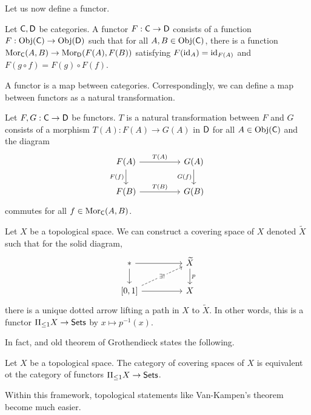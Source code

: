 Let us now define a functor. 
\begin{definition}[Functor]
  Let $\mathsf{C},\mathsf{D}$ be categories. A functor $F:\mathsf{C}\to\mathsf{D}$ consists of a function $F:\mathrm{Obj}(\mathsf{C})\to\mathrm{Obj}(\mathsf{D})$ such that for all $A,B\in\mathrm{Obj}(\mathsf{C})$, there is a function $\mathrm{Mor}_{\mathsf{C}}(A,B)\to\mathrm{Mor}_{\mathsf{D}}(F(A),F(B))$ satisfying $F(\mathrm{id}_{A})=\mathrm{id}_{F(A)}$ and $F(g\circ f)=F(g)\circ F(f)$. 
\end{definition}
A functor is a map between categories. Correspondingly, we can define a map between functors as a natural transformation. 
\begin{definition}\label{def:natural transformation}
Let $F,G:\mathsf{C}\to\mathsf{D}$ be functors. $T$ is a natural transformation between $F$ and $G$ consists of a morphism $T(A):F(A)\to G(A)$ in $\mathsf{D}$ for all $A\in\mathrm{Obj}(\mathsf{C})$ and the diagram
$$\begin{tikzcd}
	{F(A)} && {G(A)} \\
	{F(B)} && {G(B)}
	\arrow["{T(A)}", from=1-1, to=1-3]
	\arrow["{T(B)}", from=2-1, to=2-3]
	\arrow["{F(f)}"', from=1-1, to=2-1]
	\arrow["{G(f)}"', from=1-3, to=2-3]
\end{tikzcd}$$
commutes for all $f\in\mathrm{Mor}_{\mathsf{C}}(A,B)$. 
\end{definition}
\begin{example}
  Let $X$ be a topological space. We can construct a covering space of $X$ denoted $\widetilde{X}$ such that for the solid diagram, 
  $$%
  \begin{tikzcd}
    {*} && {\widetilde{X}} \\
    {[0,1]} && X
    \arrow[from=1-1, to=1-3]
    \arrow["p", from=1-3, to=2-3]
    \arrow[from=1-1, to=2-1]
    \arrow[from=2-1, to=2-3]
    \arrow["{\exists!}"{description}, dashed, from=2-1, to=1-3]
  \end{tikzcd}$$
  there is a unique dotted arrow lifting a path in $X$ to $\widetilde{X}$. In other words, this is a functor $\Pi_{\leq 1}X\to\mathsf{Sets}$ by $x\mapsto p^{-1}(x)$. 
\end{example}
In fact, and old theorem of Grothendieck states the following. 
\begin{theorem}[Grothendieck]
  Let $X$ be a topological space. The category of covering spaces of $X$ is equivalent ot the category of functors $\Pi_{\leq 1}X\to\mathsf{Sets}$. 
\end{theorem}
Within this framework, topological statements like Van-Kampen's theorem become much easier. 

